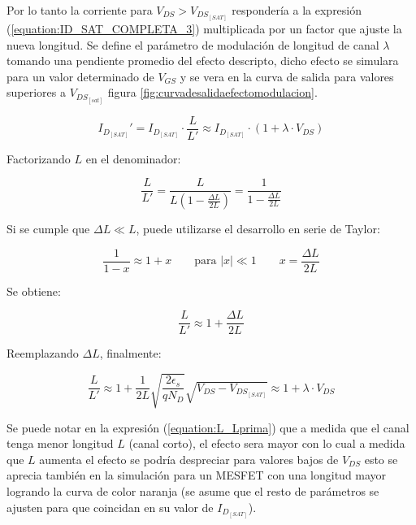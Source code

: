 \documentclass[a4paper]{article}
\begin{document}
Por lo tanto la corriente para $V_{DS} > V_{DS_{[SAT]}} $ respondería a la expresión (\ref{equation:ID_SAT_COMPLETA_3}) multiplicada por un factor que ajuste la nueva longitud. Se define el parámetro de modulación de longitud de canal $\lambda $ tomando una pendiente promedio del efecto descripto, dicho efecto se simulara para un valor determinado de $V_{GS}$ y se vera en la curva de salida para valores superiores a $V_{DS_{[sat]}}$ figura \ref{fig:curvadesalidaefectomodulacion}.
	
	\begin{equation}
		I_{D_{[SAT]} } ' = I_{D_{[SAT]} } \cdot \frac{L}{L'}  \approx I_{D_{[SAT]} } \cdot (1 + \lambda \cdot V_{DS})
	\end{equation}


Factorizando $L$ en el denominador:

\begin{equation}
	\frac{L}{L'} =
	\frac{L}{L \left( 1 - \frac{\Delta L}{2L} \right)}
	=
	\frac{1}{1 - \frac{\Delta L}{2L}}
\end{equation}

Si se cumple que $\Delta L \ll L$, puede utilizarse el desarrollo en serie de Taylor:

\begin{equation}
	\frac{1}{1-x} \approx 1 + x \qquad \text{para } |x| \ll 1 \quad \quad 	x = \frac{\Delta L}{2L}
\end{equation}

Se obtiene:

\begin{equation}
	\frac{L}{L'} \approx 1 + \frac{\Delta L}{2L}
\end{equation}

Reemplazando $\Delta L $, finalmente:

\begin{equation}\label{equation:L_Lprima}
	\frac{L}{L'}
	\approx
	1 +
	\frac{1}{2L}
	\sqrt{
		\frac{2 \epsilon_s}{q N_D}
	}
	\sqrt{V_{DS} - V_{DS_{[SAT]}}}	\approx
	1 + \lambda \cdot V_{DS}
\end{equation}



Se puede notar en la expresión (\ref{equation:L_Lprima})  que a medida que el canal tenga menor longitud $L$ (canal corto), el efecto sera mayor con lo cual a medida que $L$ aumenta el efecto se podría despreciar para valores bajos de $V_{DS}$ esto se aprecia también en la simulación para un MESFET con una longitud mayor logrando la curva de color naranja (se asume que el resto de parámetros se ajusten para que coincidan en su valor de $I_{D_{[SAT]}}$).
\end{document}
